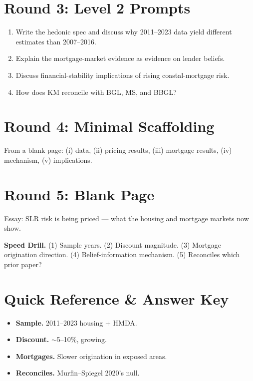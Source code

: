 \documentclass[11pt]{article}
\begin{document}
\section*{Round 3: Level 2 Prompts}
\begin{enumerate}
\item Write the hedonic spec and discuss why 2011--2023 data yield different estimates than 2007--2016.
\item Explain the mortgage-market evidence as evidence on lender beliefs.
\item Discuss financial-stability implications of rising coastal-mortgage risk.
\item How does KM reconcile with BGL, MS, and BBGL?
\end{enumerate}

\section*{Round 4: Minimal Scaffolding}
From a blank page: (i) data, (ii) pricing results, (iii) mortgage results, (iv) mechanism, (v) implications.

\section*{Round 5: Blank Page}
Essay: SLR risk is being priced --- what the housing and mortgage markets now show.

\vspace{6pt}
\begin{drillbox}
\textbf{Speed Drill.} (1) Sample years. (2) Discount magnitude. (3) Mortgage origination direction. (4) Belief-information mechanism. (5) Reconciles which prior paper?
\end{drillbox}

\section*{Quick Reference \& Answer Key}
\begin{answerbox}
\begin{itemize}
\item \textbf{Sample.} 2011--2023 housing + HMDA.
\item \textbf{Discount.} $\sim$5--10\%, growing.
\item \textbf{Mortgages.} Slower origination in exposed areas.
\item \textbf{Reconciles.} Murfin--Spiegel 2020's null.
\end{itemize}
\end{answerbox}
\end{document}
